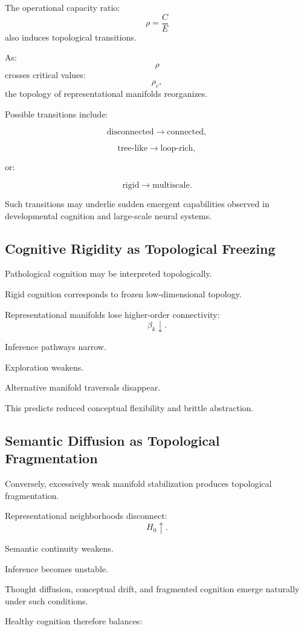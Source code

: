 \documentclass[12pt,a4paper]{article}
\begin{document}
The operational capacity ratio:
\[
\rho
=
\frac{C}{E}
\]
also induces topological transitions.

As:
\[
\rho
\]
crosses critical values:
\[
\rho_c,
\]
the topology of representational manifolds reorganizes.

Possible transitions include:

\[
\text{disconnected}
\rightarrow
\text{connected},
\]

\[
\text{tree-like}
\rightarrow
\text{loop-rich},
\]

or:

\[
\text{rigid}
\rightarrow
\text{multiscale}.
\]

Such transitions may underlie sudden emergent capabilities observed in developmental cognition and large-scale neural systems.

\subsection{Cognitive Rigidity as Topological Freezing}

Pathological cognition may be interpreted topologically.

Rigid cognition corresponds to frozen low-dimensional topology.

Representational manifolds lose higher-order connectivity:
\[
\beta_k
\downarrow.
\]

Inference pathways narrow.

Exploration weakens.

Alternative manifold traversals disappear.

This predicts reduced conceptual flexibility and brittle abstraction.

\subsection{Semantic Diffusion as Topological Fragmentation}

Conversely, excessively weak manifold stabilization produces topological fragmentation.

Representational neighborhoods disconnect:
\[
H_0
\uparrow.
\]

Semantic continuity weakens.

Inference becomes unstable.

Thought diffusion, conceptual drift, and fragmented cognition emerge naturally under such conditions.

Healthy cognition therefore balances:
\end{document}
